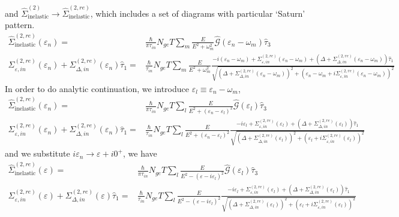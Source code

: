 \documentclass[]{article}
\begin{document}
and $\widehat{\Sigma}_\text{inelastic}^{(2)}\rightarrow \widehat{\Sigma}_\text{inelastic}^{(2,re)}$,
which includes a set of diagrams with particular `Saturn' pattern.
\begin{align}
    \widehat{\Sigma}_\text{inelastic}^{(2,re)}(\varepsilon_n)
    = & \frac{\hbar}{\pi\tau_{in}}N_{ge}T\sum_{m}\frac{E}{E^2+\omega_m^2}
    \widehat{\mathcal{G}}(\varepsilon_n-\omega_m)\widehat{\tau}_3 \\
    \Sigma_{\varepsilon,in}^{(2,re)}(\varepsilon_n) + \Sigma_{\Delta,in}^{(2,re)}(\varepsilon_n)\widehat{\tau}_1
    = & \frac{\hbar}{\tau_{in}}N_{ge}T\sum_{m}\frac{E}{E^2+\omega_m^2}
    \frac{-i(\varepsilon_n-\omega_m) + \Sigma_{\varepsilon,in}^{(2,re)}(\varepsilon_n-\omega_m)
     + \left(\Delta+\Sigma_{\Delta,in}^{(2,re)}(\varepsilon_n-\omega_m)\right)\widehat{\tau}_1}
     {\sqrt{\left(\Delta+\Sigma_{\Delta,in}^{(2,re)}(\varepsilon_n-\omega_m)\right)^2 
     + \left(\varepsilon_n-\omega_m+i\Sigma_{\varepsilon,in}^{(2,re)}(\varepsilon_n-\omega_m)\right)^2}}
\end{align}
In order to do analytic continuation, we introduce $\varepsilon_l \equiv \varepsilon_n - \omega_m$,
\begin{align}
    \widehat{\Sigma}_\text{inelastic}^{(2,re)}(\varepsilon_n)
    = & \frac{\hbar}{\pi\tau_{in}}N_{ge}T\sum_l\frac{E}{E^2+(\varepsilon_n-\varepsilon_l)^2}
    \widehat{\mathcal{G}}(\varepsilon_l)\widehat{\tau}_3 \\
    \Sigma_{\varepsilon,in}^{(2,re)}(\varepsilon_n) + \Sigma_{\Delta,in}^{(2,re)}(\varepsilon_n)\widehat{\tau}_1
    = & \frac{\hbar}{\tau_{in}}N_{ge}T\sum_l\frac{E}{E^2+(\varepsilon_n-\varepsilon_l)^2}
    \frac{-i\varepsilon_l + \Sigma_{\varepsilon,in}^{(2,re)}(\varepsilon_l)
     + \left(\Delta+\Sigma_{\Delta,in}^{(2,re)}(\varepsilon_l)\right)\widehat{\tau}_1}
     {\sqrt{\left(\Delta+\Sigma_{\Delta,in}^{(2,re)}(\varepsilon_l)\right)^2 
     + \left(\varepsilon_l+i\Sigma_{\varepsilon,in}^{(2,re)}(\varepsilon_l)\right)^2}}\label{renormalized}
\end{align}
and we substitute $i\varepsilon_n \rightarrow \varepsilon + i0^+$, we have
\begin{align}
    \widehat{\Sigma}_\text{inelastic}^{(2,re)}(\varepsilon)
    = & \frac{\hbar}{\pi\tau_{in}}N_{ge}T\sum_l\frac{E}{E^2-(\varepsilon-i\varepsilon_l)^2}
    \widehat{\mathcal{G}}(\varepsilon_l)\widehat{\tau}_3 \\
    \Sigma_{\varepsilon,in}^{(2,re)}(\varepsilon) + \Sigma_{\Delta,in}^{(2,re)}(\varepsilon)\widehat{\tau}_1
    = & \frac{\hbar}{\tau_{in}}N_{ge}T\sum_l\frac{E}{E^2-(\varepsilon-i\varepsilon_l)^2}
    \frac{-i\varepsilon_l + \Sigma_{\varepsilon,in}^{(2,re)}(\varepsilon_l)
     + \left(\Delta+\Sigma_{\Delta,in}^{(2,re)}(\varepsilon_l)\right)\widehat{\tau}_1}
     {\sqrt{\left(\Delta+\Sigma_{\Delta,in}^{(2,re)}(\varepsilon_l)\right)^2 
     + \left(\varepsilon_l+i\Sigma_{\varepsilon,in}^{(2,re)}(\varepsilon_l)\right)^2}}
\end{align}
\end{document}
